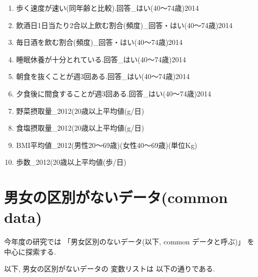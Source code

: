 \begin{multicols}{2}
\begin{enumerate}
  \item 歩く速度が速い(同年齢と比較).回答\_はい(40〜74歳)2014
  \item 飲酒日1日当たり2合以上飲む割合(頻度)\_回答・はい(40〜74歳)2014
  \item 毎日酒を飲む割合(頻度)\_回答・はい(40〜74歳)2014
  \item 睡眠休養が十分とれている.回答\_はい(40〜74歳)2014
  \item 朝食を抜くことが週3回ある.回答\_はい(40〜74歳)2014
  \item 夕食後に間食することが週3回ある.回答\_はい(40〜74歳)2014
  \item 野菜摂取量\_2012(20歳以上平均値(g/日)
  \item 食塩摂取量\_2012(20歳以上平均値(g/日)
  \item BMI平均値\_2012(男性20〜69歳)(女性40〜69歳)(単位Kg)
  \item 歩数\_2012(20歳以上平均値(歩/日)
\end{enumerate}


\end{multicols}




\newpage

\section{男女の区別がないデータ(common data)}



{今年度の研究では
「男女区別のないデータ(以下, common データと呼ぶ)」
を中心に探索する.
}


以下, 男女の区別がないデータの
変数リストは
以下の通りである.

%
%
%
%
%







